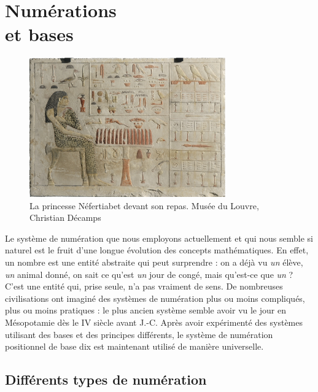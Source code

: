 
         
\chapter{Numérations\\et bases} \label{N1}

\vfill

\begin{figure}[h]
   \centering
      \includegraphics[height=6cm]{Nombres_et_calculs/Images/N1_intro_Nefertiabet}
   \caption{La princesse Néfertiabet devant son repas. Musée du Louvre, Christian Décamps}
\end{figure}

\vfill
\begin{prerequis}
   Le système de numération que nous employons actuellement et qui nous semble si naturel est le fruit d'une longue évolution des concepts mathématiques. En effet, un nombre est une entité abstraite qui peut surprendre : on a déjà vu \textit{un} élève, \textit{un} animal donné, on sait ce qu'est \textit{un} jour de congé, mais qu'est-ce que \textit{un} ? C'est une entité qui, prise seule, n'a pas vraiment de sens. De nombreuses civilisations ont imaginé des systèmes de numération plus ou moins compliqués, plus ou moins pratiques : le plus ancien système semble avoir vu le jour en Mésopotamie dès le {\small IV} siècle avant J.-C. Après avoir expérimenté des systèmes utilisant des bases et des principes différents, le système de numération positionnel de base dix est maintenant utilisé de manière universelle.
\end{prerequis}



\cours %

\section{Différents types de numération} %

